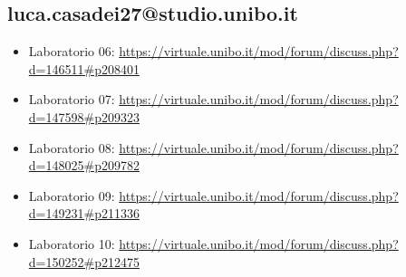 \documentclass[a4paper,12pt]{report}
\begin{document}
\subsection{luca.casadei27@studio.unibo.it}
\begin{itemize}
	\item Laboratorio 06: \url{https://virtuale.unibo.it/mod/forum/discuss.php?d=146511#p208401}
	\item Laboratorio 07: \url{https://virtuale.unibo.it/mod/forum/discuss.php?d=147598#p209323}
	\item Laboratorio 08: \url{https://virtuale.unibo.it/mod/forum/discuss.php?d=148025#p209782}
	\item Laboratorio 09: \url{https://virtuale.unibo.it/mod/forum/discuss.php?d=149231#p211336}
	\item Laboratorio 10: \url{https://virtuale.unibo.it/mod/forum/discuss.php?d=150252#p212475}
\end{itemize}
\end{document}

